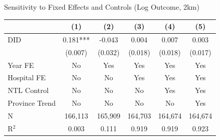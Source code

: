 \documentclass{beamer}
\begin{document}
\begin{frame}{Sensitivity to Fixed Effects and Controls (Log Outcome, 2km)}

\centering
\footnotesize
\setlength{\tabcolsep}{2pt}

\begin{table}[htbp]
\centering

\begin{tabular}{lccccc}
\toprule
& (1) & (2) & (3) & (4) & (5) \\
\midrule

DID
& 0.181***
& -0.043
& 0.004
& 0.007
& 0.003 \\
& (0.007)
& (0.032)
& (0.018)
& (0.018)
& (0.017) \\

\midrule

Year FE
& No & Yes & Yes & Yes & Yes \\

Hospital FE
& No & No & Yes & Yes & Yes \\

NTL Control
& No & No & No & Yes & Yes \\

Province Trend
& No & No & No & No & Yes \\

\midrule

N
& 166,113
& 165,909
& 164,703
& 164,674
& 164,674 \\

R$^{2}$
& 0.003
& 0.111
& 0.919
& 0.919
& 0.923 \\

\bottomrule
\end{tabular}

\end{table}

\end{frame}
\end{document}
